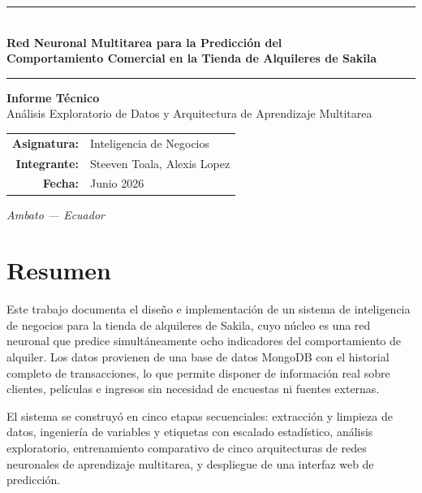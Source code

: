\documentclass[12pt, a4paper]{report}
\begin{document}

\begin{titlepage}
  \thispagestyle{fancy}
  \centering
  \vspace*{2cm}

  \color{uta-azul}
  \rule{0.85\textwidth}{1.2pt}\\[8pt]
  {\large\bfseries Red Neuronal Multitarea para la Predicción del\\[5pt]
   Comportamiento Comercial en la Tienda de Alquileres de Sakila}\\[8pt]
  \rule{0.85\textwidth}{1.2pt}

  \vspace{1.5cm}
  \color{black}
  {\normalsize\bfseries Informe Técnico}\\[4pt]
  {\small Análisis Exploratorio de Datos y Arquitectura de Aprendizaje Multitarea}

  \vspace{2cm}
  \begin{tabular}{rl}
    \textbf{Asignatura:}    & Inteligencia de Negocios \\[4pt]
    \textbf{Integrante:}    & Steeven Toala, Alexis Lopez \\[4pt]
    \textbf{Fecha:}         & Junio 2026 \\[4pt]
  \end{tabular}

  \vfill
  {\small\itshape Ambato --- Ecuador}
\end{titlepage}

\chapter*{Resumen}

Este trabajo documenta el diseño e implementación de un sistema de inteligencia de negocios para la tienda de alquileres de Sakila, cuyo núcleo es una red neuronal que predice simultáneamente ocho indicadores del comportamiento de alquiler. Los datos provienen de una base de datos MongoDB con el historial completo de transacciones, lo que permite disponer de información real sobre clientes, películas e ingresos sin necesidad de encuestas ni fuentes externas.

El sistema se construyó en cinco etapas secuenciales: extracción y limpieza de datos, ingeniería de variables y etiquetas con escalado estadístico, análisis exploratorio, entrenamiento comparativo de cinco arquitecturas de redes neuronales de aprendizaje multitarea, y despliegue de una interfaz web de predicción.
\end{document}
